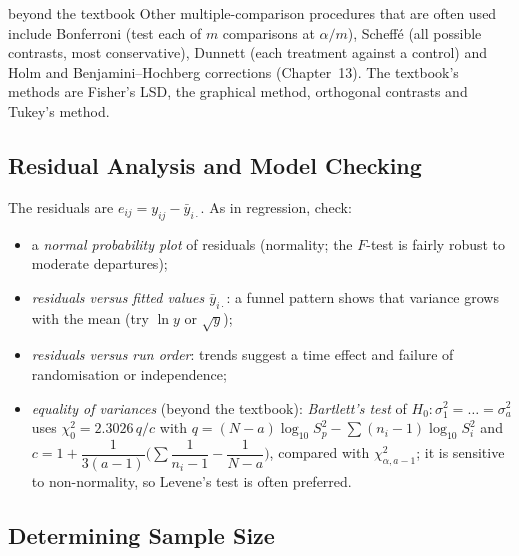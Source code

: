 \begin{interview}{beyond the textbook}
Other multiple-comparison procedures that are often used include Bonferroni (test each of $m$ comparisons at $\alpha/m$), Scheff\'e (all possible contrasts, most conservative), Dunnett (each treatment against a control) and Holm and Benjamini--Hochberg corrections (Chapter~13). The textbook's methods are Fisher's LSD, the graphical method, orthogonal contrasts and Tukey's method.
\end{interview}

\subsection{Residual Analysis and Model Checking}

The residuals are $e_{ij}=y_{ij}-\bar{y}_{i\cdot}$. As in regression, check:
\begin{itemize}
  \item a \emph{normal probability plot} of residuals (normality; the $F$-test is fairly robust to moderate departures);
  \item \emph{residuals versus fitted values $\bar{y}_{i\cdot}$}: a funnel pattern shows that variance grows with the mean (try $\ln y$ or $\sqrt y$);
  \item \emph{residuals versus run order}: trends suggest a time effect and failure of randomisation or independence;
  \item \emph{equality of variances} (beyond the textbook): \emph{Bartlett's test} of $H_0:\sigma_1^2=\dots=\sigma_a^2$ uses $\chi_0^2=2.3026\,q/c$ with $q=(N-a)\log_{10}S_p^2-\sum(n_i-1)\log_{10}S_i^2$ and $c=1+\dfrac1{3(a-1)}\Big(\sum\dfrac1{n_i-1}-\dfrac1{N-a}\Big)$, compared with $\chi^2_{\alpha,a-1}$; it is sensitive to non-normality, so Levene's test is often preferred.
\end{itemize}

\subsection{Determining Sample Size}

